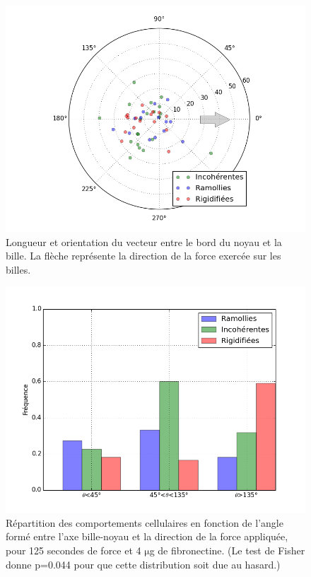 \documentclass                                                                                                                                                                                                                                                                                                                                       {report}
\newcommand{\micro}{$\mathrm{\mu}$}
\begin{document}
\begin{figure}[p]
\includegraphics[scale=0.45]{Figures/Positions_FRI.png} 
\caption{Longueur et orientation du vecteur entre le bord du noyau et la bille. La flèche représente la direction de la force exercée sur les billes.\label{polar}}
\end{figure}
\begin{figure}[p]
\includegraphics[scale=0.45]{Figures/Hist_Angles.png} 
\caption{Répartition des comportements cellulaires en fonction de l'angle formé entre l'axe bille-noyau et la direction de la force appliquée, pour 125 secondes de force et 4 \micro g de fibronectine. (Le test de Fisher donne p=0.044 pour que cette distribution soit due au hasard.) \label{Angle_C4}}
\end{figure}
\end{document}
